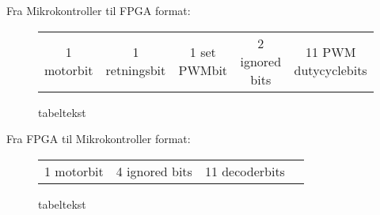 
  
Fra Mikrokontroller til FPGA format:
\begin{figure}[th!]
\centering
\begin{tabular}{c|c|c|c|c}
1 motorbit &1 retningsbit & 1 set PWMbit & 2 ignored bits & 11 PWM dutycyclebits
\end{tabular}
\captionsetup{type=figure}
\caption[tekst i indholdsfortegnelsen]{tabeltekst}
\label{tb:protokol1}
\end{figure}

   
  
  Fra FPGA til Mikrokontroller format:
 \begin{figure}[th!]
 \centering
 \begin{tabular}{c|c|c|c}
 1 motorbit & 4 ignored bits & 11 decoderbits
  
 \end{tabular}
 \captionsetup{type=figure}
 \caption[tekst i indholdsfortegnelsen]{tabeltekst}
 \label{tb:protokol2}
 \end{figure}
